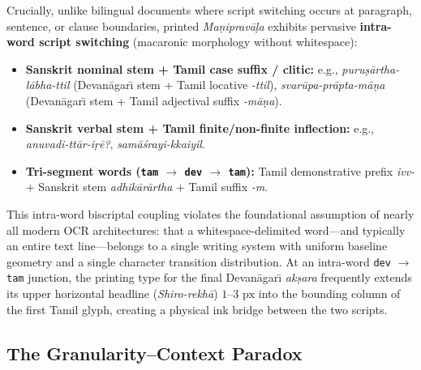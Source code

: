 \documentclass[10pt,twocolumn]{article}
\begin{document}
Crucially, unlike bilingual documents where script switching occurs at paragraph, sentence, or clause boundaries, printed \emph{Ma\d{n}iprav\={a}\d{l}a} exhibits pervasive \textbf{intra-word script switching} (macaronic morphology without whitespace):
\begin{itemize}
    \item \textbf{Sanskrit nominal stem + Tamil case suffix / clitic:} e.g., \emph{puru\d{s}\={a}rtha-l\={a}bha-ttil} (Devan\={a}gar\={\i} stem + Tamil locative \emph{-ttil}), \emph{svar\={u}pa-pr\={a}pta-m\={a}\d{n}a} (Devan\={a}gar\={\i} stem + Tamil adjectival suffix \emph{-m\={a}\d{n}a}).
    \item \textbf{Sanskrit verbal stem + Tamil finite/non-finite inflection:} e.g., \emph{anuvadi-tt\={a}r-i\d{r}\={e}?}, \emph{sam\={a}\'{s}rayi-kkaiyil}.
    \item \textbf{Tri-segment words (\texttt{tam} $\to$ \texttt{dev} $\to$ \texttt{tam}):} Tamil demonstrative prefix \emph{ivv-} + Sanskrit stem \emph{adhik\={a}r\={a}rtha} + Tamil suffix \emph{-m}.
\end{itemize}

This intra-word biscriptal coupling violates the foundational assumption of nearly all modern OCR architectures: that a whitespace-delimited word---and typically an entire text line---belongs to a single writing system with uniform baseline geometry and a single character transition distribution. At an intra-word \texttt{dev} $\to$ \texttt{tam} junction, the printing type for the final Devan\={a}gar\={\i} \emph{ak\d{s}ara} frequently extends its upper horizontal headline (\emph{Shiro-rekh\={a}}) $1\text{--}3\text{ px}$ into the bounding column of the first Tamil glyph, creating a physical ink bridge between the two scripts.

\subsection{The Granularity--Context Paradox}
\end{document}
